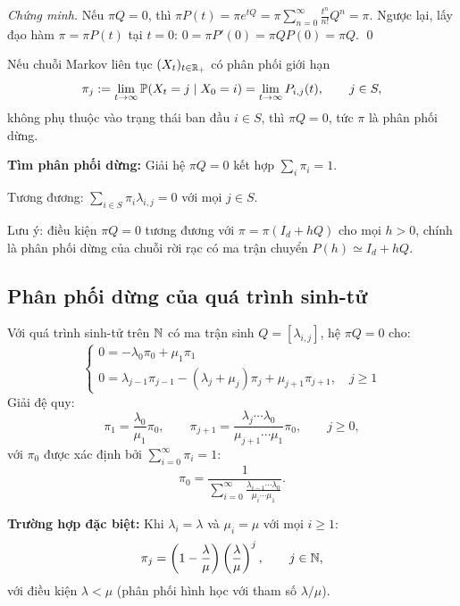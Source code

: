 \textit{Chứng minh.} Nếu $\pi Q = 0$, thì $\pi P(t) = \pi e^{tQ} = \pi \sum_{n=0}^{\infty} \frac{t^n}{n!} Q^n = \pi$.
Ngược lại, lấy đạo hàm $\pi = \pi P(t)$ tại $t = 0$: $0 = \pi P'(0) = \pi Q P(0) = \pi Q$. \qed

\begin{proposition}[(Mệnh đề 5)]
Nếu chuỗi Markov liên tục $(X_t)_{t\in\mathbb{R}_+}$ có phân phối giới hạn
\[
  \pi_j := \lim_{t\to\infty} \mathbb{P}(X_t = j \mid X_0 = i) = \lim_{t\to\infty} P_{i,j}(t), \qquad j \in S,
\]
không phụ thuộc vào trạng thái ban đầu $i \in S$, thì $\pi Q = 0$, tức $\pi$ là phân phối dừng.
\end{proposition}

\begin{congthuc}
\textbf{Tìm phân phối dừng:} Giải hệ $\pi Q = 0$ kết hợp $\sum_i \pi_i = 1$.

Tương đương: $\sum_{i \in S} \pi_i \lambda_{i,j} = 0$ với mọi $j \in S$.

Lưu ý: điều kiện $\pi Q = 0$ tương đương với $\pi = \pi(I_d + hQ)$ cho mọi $h > 0$, chính là phân phối dừng của chuỗi rời rạc có ma trận chuyển $P(h) \simeq I_d + hQ$.
\end{congthuc}

\subsection{Phân phối dừng của quá trình sinh-tử}

Với quá trình sinh-tử trên $\mathbb{N}$ có ma trận sinh $Q = [\lambda_{i,j}]$, hệ $\pi Q = 0$ cho:
\[
  \begin{cases}
    0 = -\lambda_0 \pi_0 + \mu_1 \pi_1 \\
    0 = \lambda_{j-1}\pi_{j-1} - (\lambda_j + \mu_j)\pi_j + \mu_{j+1}\pi_{j+1}, \quad j \geq 1
  \end{cases}
\]
Giải đệ quy:
\[
  \pi_1 = \frac{\lambda_0}{\mu_1}\pi_0, \qquad
  \pi_{j+1} = \frac{\lambda_j \cdots \lambda_0}{\mu_{j+1} \cdots \mu_1} \pi_0, \qquad j \geq 0,
\]
với $\pi_0$ được xác định bởi $\sum_{i=0}^{\infty} \pi_i = 1$:
\[
  \pi_0 = \frac{1}{\displaystyle\sum_{i=0}^{\infty} \frac{\lambda_{i-1} \cdots \lambda_0}{\mu_i \cdots \mu_1}}.
\]

\textbf{Trường hợp đặc biệt:} Khi $\lambda_i = \lambda$ và $\mu_i = \mu$ với mọi $i \geq 1$:
\[
  \pi_j = \left(1 - \frac{\lambda}{\mu}\right) \left(\frac{\lambda}{\mu}\right)^j, \qquad j \in \mathbb{N},
\]
với điều kiện $\lambda < \mu$ (phân phối hình học với tham số $\lambda/\mu$).

